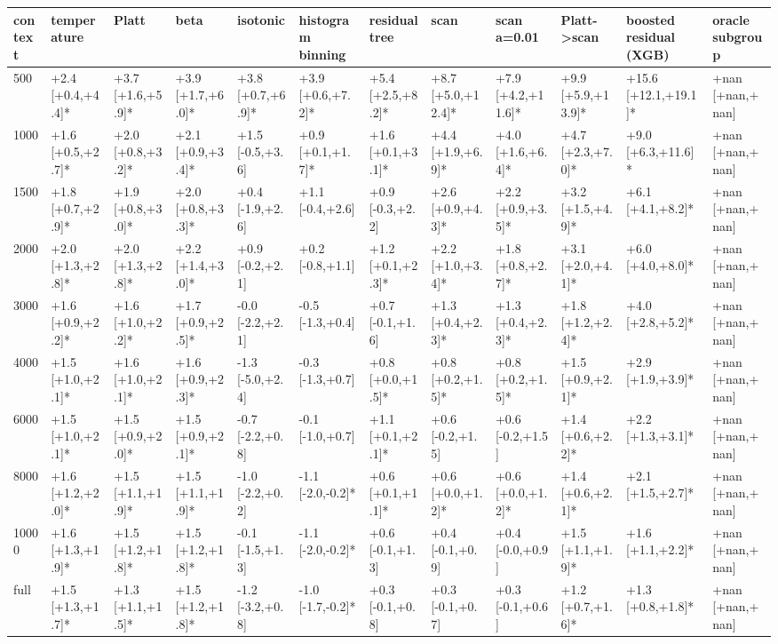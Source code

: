 \begin{tabular}{llllllllllll}
\toprule
context & temperature & Platt & beta & isotonic & histogram binning & residual tree & scan & scan a=0.01 & Platt->scan & boosted residual (XGB) & oracle subgroup \\
\midrule
500 & +2.4 [+0.4,+4.4]* & +3.7 [+1.6,+5.9]* & +3.9 [+1.7,+6.0]* & +3.8 [+0.7,+6.9]* & +3.9 [+0.6,+7.2]* & +5.4 [+2.5,+8.2]* & +8.7 [+5.0,+12.4]* & +7.9 [+4.2,+11.6]* & +9.9 [+5.9,+13.9]* & +15.6 [+12.1,+19.1]* & +nan [+nan,+nan] \\
1000 & +1.6 [+0.5,+2.7]* & +2.0 [+0.8,+3.2]* & +2.1 [+0.9,+3.4]* & +1.5 [-0.5,+3.6] & +0.9 [+0.1,+1.7]* & +1.6 [+0.1,+3.1]* & +4.4 [+1.9,+6.9]* & +4.0 [+1.6,+6.4]* & +4.7 [+2.3,+7.0]* & +9.0 [+6.3,+11.6]* & +nan [+nan,+nan] \\
1500 & +1.8 [+0.7,+2.9]* & +1.9 [+0.8,+3.0]* & +2.0 [+0.8,+3.3]* & +0.4 [-1.9,+2.6] & +1.1 [-0.4,+2.6] & +0.9 [-0.3,+2.2] & +2.6 [+0.9,+4.3]* & +2.2 [+0.9,+3.5]* & +3.2 [+1.5,+4.9]* & +6.1 [+4.1,+8.2]* & +nan [+nan,+nan] \\
2000 & +2.0 [+1.3,+2.8]* & +2.0 [+1.3,+2.8]* & +2.2 [+1.4,+3.0]* & +0.9 [-0.2,+2.1] & +0.2 [-0.8,+1.1] & +1.2 [+0.1,+2.3]* & +2.2 [+1.0,+3.4]* & +1.8 [+0.8,+2.7]* & +3.1 [+2.0,+4.1]* & +6.0 [+4.0,+8.0]* & +nan [+nan,+nan] \\
3000 & +1.6 [+0.9,+2.2]* & +1.6 [+1.0,+2.2]* & +1.7 [+0.9,+2.5]* & -0.0 [-2.2,+2.1] & -0.5 [-1.3,+0.4] & +0.7 [-0.1,+1.6] & +1.3 [+0.4,+2.3]* & +1.3 [+0.4,+2.3]* & +1.8 [+1.2,+2.4]* & +4.0 [+2.8,+5.2]* & +nan [+nan,+nan] \\
4000 & +1.5 [+1.0,+2.1]* & +1.6 [+1.0,+2.1]* & +1.6 [+0.9,+2.3]* & -1.3 [-5.0,+2.4] & -0.3 [-1.3,+0.7] & +0.8 [+0.0,+1.5]* & +0.8 [+0.2,+1.5]* & +0.8 [+0.2,+1.5]* & +1.5 [+0.9,+2.1]* & +2.9 [+1.9,+3.9]* & +nan [+nan,+nan] \\
6000 & +1.5 [+1.0,+2.1]* & +1.5 [+0.9,+2.0]* & +1.5 [+0.9,+2.1]* & -0.7 [-2.2,+0.8] & -0.1 [-1.0,+0.7] & +1.1 [+0.1,+2.1]* & +0.6 [-0.2,+1.5] & +0.6 [-0.2,+1.5] & +1.4 [+0.6,+2.2]* & +2.2 [+1.3,+3.1]* & +nan [+nan,+nan] \\
8000 & +1.6 [+1.2,+2.0]* & +1.5 [+1.1,+1.9]* & +1.5 [+1.1,+1.9]* & -1.0 [-2.2,+0.2] & -1.1 [-2.0,-0.2]* & +0.6 [+0.1,+1.1]* & +0.6 [+0.0,+1.2]* & +0.6 [+0.0,+1.2]* & +1.4 [+0.6,+2.1]* & +2.1 [+1.5,+2.7]* & +nan [+nan,+nan] \\
10000 & +1.6 [+1.3,+1.9]* & +1.5 [+1.2,+1.8]* & +1.5 [+1.2,+1.8]* & -0.1 [-1.5,+1.3] & -1.1 [-2.0,-0.2]* & +0.6 [-0.1,+1.3] & +0.4 [-0.1,+0.9] & +0.4 [-0.0,+0.9] & +1.5 [+1.1,+1.9]* & +1.6 [+1.1,+2.2]* & +nan [+nan,+nan] \\
full & +1.5 [+1.3,+1.7]* & +1.3 [+1.1,+1.5]* & +1.5 [+1.2,+1.8]* & -1.2 [-3.2,+0.8] & -1.0 [-1.7,-0.2]* & +0.3 [-0.1,+0.8] & +0.3 [-0.1,+0.7] & +0.3 [-0.1,+0.6] & +1.2 [+0.7,+1.6]* & +1.3 [+0.8,+1.8]* & +nan [+nan,+nan] \\
\bottomrule
\end{tabular}
